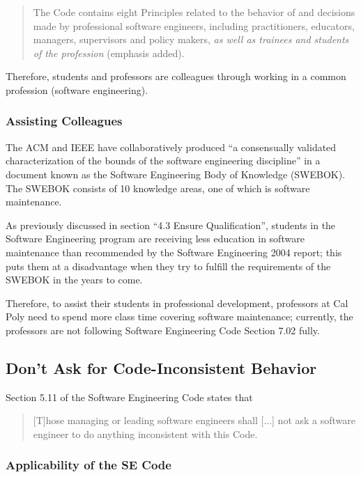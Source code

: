 \documentclass[11pt]{article}
\begin{document}
\begin{multicols}{2}
\begin{quote}
The Code contains eight Principles related to the behavior of and decisions made by professional software engineers, including practitioners, educators, managers, supervisors and policy makers, \emph{as well as trainees and students of the profession} (emphasis added). \cite{secode}
\end{quote}

Therefore, students and professors are colleagues through working in a common profession (software engineering).

\subsubsection{Assisting Colleagues}

The ACM and IEEE have collaboratively produced ``a consensually validated characterization of the bounds of the software engineering discipline'' in a document known as the Software Engineering Body of Knowledge (SWEBOK). \cite{swebok}  The SWEBOK consists of 10 knowledge areas, one of which is software maintenance. \cite{swebok}

As previously discussed in section ``4.3 Ensure Qualification'', students in the Software Engineering program are receiving less education in software maintenance than recommended by the Software Engineering 2004 report; this puts them at a disadvantage when they try to fulfill the requirements of the SWEBOK in the years to come.

Therefore, to assist their students in professional development, professors at Cal Poly need to spend more class time covering software maintenance; currently, the professors are not following Software Engineering Code Section 7.02 fully.

\subsection{Don't Ask for Code-Inconsistent Behavior}

Section 5.11 of the Software Engineering Code states that

\begin{quote}
[T]hose managing or leading software engineers shall [...] not ask a software engineer to do anything inconsistent with this Code. \cite{secode}
\end{quote}

\subsubsection{Applicability of the SE Code}


\end{multicols}
\end{document}
